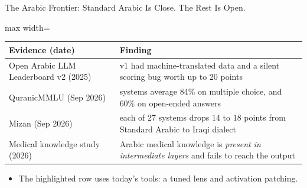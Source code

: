 \begin{frame}{The Arabic Frontier: Standard Arabic Is Close. The Rest Is Open.}
    \begin{center}
    \small
    \renewcommand{\arraystretch}{1.18}
    \begin{adjustbox}{max width=\linewidth}\begin{tabular}{>{\raggedright\arraybackslash}p{3.9cm}>{\raggedright\arraybackslash}p{9.4cm}}
        \toprule
        \textbf{Evidence (date)} & \textbf{Finding} \\
        \midrule
        Open Arabic LLM Leaderboard v2 (2025) & v1 had machine-translated data and a silent scoring bug worth up to 20 points \\
        QuranicMMLU (Sep 2026) & 12 systems average 84\% on multiple choice, and 60\% on open-ended answers \\
        Mizan (Sep 2026) & each of 27 systems drops 14 to 18 points from Standard Arabic to Iraqi dialect \\
        \rowcolor{KAUSTcyan!12} Medical knowledge study (2026) & Arabic medical knowledge is \emph{present in intermediate layers} and fails to reach the output \\
        \bottomrule
    \end{tabular}\end{adjustbox}
    \end{center}
    \begin{itemize}\itemsep0.4em
        \item The highlighted row uses today's tools: a tuned lens and activation patching.
    \end{itemize}
\end{frame}

